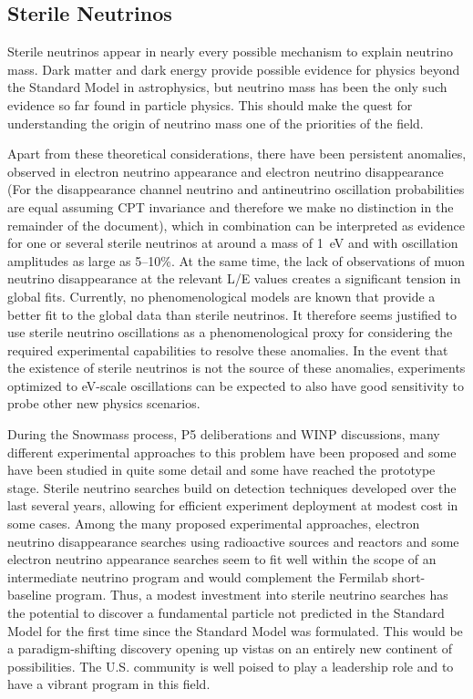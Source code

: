 \subsection{Sterile Neutrinos}
\label{sec:Sterile}

Sterile neutrinos appear in nearly every possible mechanism to explain
neutrino mass. Dark matter and dark energy provide possible evidence
for physics beyond the Standard Model in astrophysics, but neutrino
mass has been the only such evidence so far found in particle
physics. This should make the quest for understanding the origin of
neutrino mass one of the priorities of the field.

Apart from these theoretical considerations, there have been
persistent anomalies, observed in electron neutrino appearance and
electron neutrino disappearance (For the disappearance channel
neutrino and antineutrino oscillation probabilities are equal assuming
CPT invariance and therefore we make no distinction in the remainder of
the document), which in combination can be interpreted as evidence
for one or several sterile neutrinos at around a mass of 1~eV and with
oscillation amplitudes as large as 5--10\%. At the same time, the lack
of observations of muon neutrino disappearance at the relevant L/E
values creates a significant tension in global fits. Currently, no
phenomenological models are known that provide a better fit to the
global data than sterile neutrinos. It therefore seems justified to
use sterile neutrino oscillations as a phenomenological proxy for
considering the required experimental capabilities to resolve these
anomalies. In the event that the existence of sterile neutrinos is not
the source of these anomalies, experiments optimized to eV-scale
oscillations can be expected to also have good sensitivity to probe
other new physics scenarios.

During the Snowmass process, P5 deliberations and WINP discussions,
many different experimental approaches to this problem have been
proposed and some have been studied in quite some detail and some have
reached the prototype stage. Sterile neutrino searches build on
detection techniques developed over the last several years, allowing
for efficient experiment deployment at modest cost in some cases.
Among the many proposed experimental approaches, electron neutrino
disappearance searches using radioactive sources and reactors and some
electron neutrino appearance searches seem to fit well within the
scope of an intermediate neutrino program and would complement the
Fermilab short-baseline program. Thus, a modest investment into
sterile neutrino searches has the potential to discover a fundamental
particle not predicted in the Standard Model for the first time since
the Standard Model was formulated. This would be a paradigm-shifting
discovery opening up vistas on an entirely new continent of
possibilities. The U.S. community is well poised to play a leadership
role and to have a vibrant program in this field.

